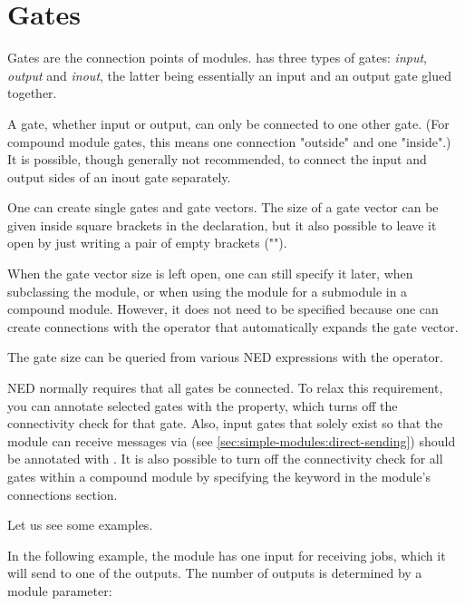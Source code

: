 


\section{Gates}
\label{sec:ch-ned-lang:gates}

Gates are the connection points of modules.  {\opp} has three types of
gates: \textit{input}, \textit{output} and \textit{inout}, the latter being
essentially an input and an output gate glued together.

A gate, whether input or output, can only be connected to one other
gate. (For compound module gates, this means one connection "outside" and
one "inside".)  It is possible, though generally not recommended, to
connect the input and output sides of an inout gate separately.

One can create single gates and gate vectors. The size of a gate vector
can be given inside square brackets in the declaration, but it also possible
to leave it open by just writing a pair of empty brackets ("\ttt{[]}").

When the gate vector size is left open, one can still specify it later,
when subclassing the module, or when using the module for a submodule in a
compound module. However, it does not need to be specified because
one can create connections with the  operator that
automatically expands the gate vector.

The gate size can be queried from various NED expressions with the
 operator.

NED normally requires that all gates be connected. To relax this
requirement, you can annotate selected gates with the 
property, which turns off the connectivity check for that gate. Also, input
gates that solely exist so that the module can receive messages via
 (see \ref{sec:simple-modules:direct-sending}) should
be annotated with . It is also possible to turn off the connectivity
check for all gates within a compound module by specifying the
 keyword in the module's connections section.

Let us see some examples.

In the following example, the  module has one input for
receiving jobs, which it will send to one of the outputs. The number of
outputs is determined by a module parameter:

